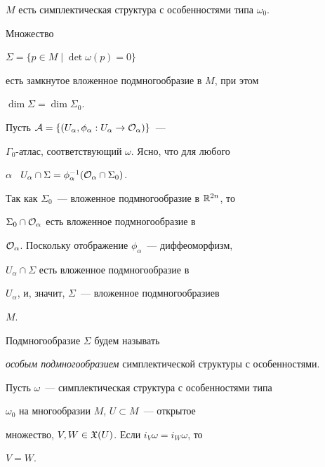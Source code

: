 $M$ есть симплектическая структура с особенностями типа $\omega_0$.





\begin{lem} \label{lm2}


Множество


$\Sigma = \{ p \in M \mid \det\omega(p)=0 \}$


есть замкнутое вложенное подмногообразие в $M$, при этом


$\dim \Sigma = \dim \Sigma_0$.


\end{lem}





\begin{pf}


Пусть $\cA=\{(U_\alpha, \phi_\alpha : U_\alpha \to


\cO_\alpha)\}$~---


$\Gamma_0$-атлас, соответствующий  $\omega$. Ясно, что для любого


$\alpha$ \ $U_\alpha \cap \Sigma = \phi_\alpha^{-1}(\cO_\alpha \cap


\Sigma_0)$.


Так как $\Sigma_0$~--- вложенное подмногообразие в ${\Bbb R}^{2n}$, то


$\Sigma_0 \cap {\cal O}_\alpha$ есть вложенное подмногообразие в


${\cal O}_\alpha$. Поскольку отображение $\phi_\alpha$~--- диффеоморфизм,


$U_\alpha \cap \Sigma$ есть вложенное подмногообразие в


$U_\alpha$, и, значит, $\Sigma$~--- вложенное подмногообразие\linebreak в


$M$.


\end{pf}





Подмногообразие $\Sigma$ будем называть


{\em особым подмногообразием} симплектической структуры с особенностями.





\begin{lem} \label{lm1}


Пусть $\omega$~--- симплектическая структура с особенностями типа


$\omega_0$ на многообразии $M$, $U \subset M$~--- открытое


множество, $V,W \in {\frak X}(U)$. Если $i_V\omega = i_W\omega$, то


$V=W$.


\end{lem}






